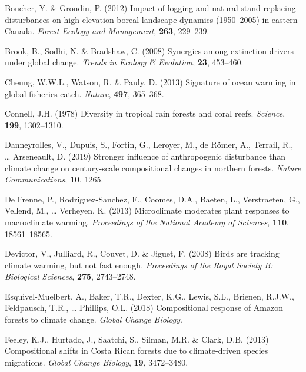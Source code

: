 \documentclass[a4paperpaper,]{article}
\begin{document}
\leavevmode\hypertarget{ref-boucher_impact_2012}{}%
Boucher, Y. \& Grondin, P. (2012) Impact of logging and natural
stand-replacing disturbances on high-elevation boreal landscape dynamics
(1950--2005) in eastern Canada. \emph{Forest Ecology and Management},
\textbf{263}, 229--239.

\leavevmode\hypertarget{ref-brook_synergies_2008}{}%
Brook, B., Sodhi, N. \& Bradshaw, C. (2008) Synergies among extinction
drivers under global change. \emph{Trends in Ecology \& Evolution},
\textbf{23}, 453--460.

\leavevmode\hypertarget{ref-cheung_signature_2013}{}%
Cheung, W.W.L., Watson, R. \& Pauly, D. (2013) Signature of ocean
warming in global fisheries catch. \emph{Nature}, \textbf{497},
365--368.

\leavevmode\hypertarget{ref-connell_diversity_1978}{}%
Connell, J.H. (1978) Diversity in tropical rain forests and coral reefs.
\emph{Science}, \textbf{199}, 1302--1310.

\leavevmode\hypertarget{ref-danneyrolles_stronger_2019}{}%
Danneyrolles, V., Dupuis, S., Fortin, G., Leroyer, M., de Römer, A.,
Terrail, R., \ldots{} Arseneault, D. (2019) Stronger influence of
anthropogenic disturbance than climate change on century-scale
compositional changes in northern forests. \emph{Nature Communications},
\textbf{10}, 1265.

\leavevmode\hypertarget{ref-de_frenne_microclimate_2013}{}%
De Frenne, P., Rodriguez-Sanchez, F., Coomes, D.A., Baeten, L.,
Verstraeten, G., Vellend, M., \ldots{} Verheyen, K. (2013) Microclimate
moderates plant responses to macroclimate warming. \emph{Proceedings of
the National Academy of Sciences}, \textbf{110}, 18561--18565.

\leavevmode\hypertarget{ref-devictor_birds_2008}{}%
Devictor, V., Julliard, R., Couvet, D. \& Jiguet, F. (2008) Birds are
tracking climate warming, but not fast enough. \emph{Proceedings of the
Royal Society B: Biological Sciences}, \textbf{275}, 2743--2748.

\leavevmode\hypertarget{ref-esquivel-muelbert_compositional_2018}{}%
Esquivel-Muelbert, A., Baker, T.R., Dexter, K.G., Lewis, S.L., Brienen,
R.J.W., Feldpausch, T.R., \ldots{} Phillips, O.L. (2018) Compositional
response of Amazon forests to climate change. \emph{Global Change
Biology}.

\leavevmode\hypertarget{ref-feeley_compositional_2013}{}%
Feeley, K.J., Hurtado, J., Saatchi, S., Silman, M.R. \& Clark, D.B.
(2013) Compositional shifts in Costa Rican forests due to climate-driven
species migrations. \emph{Global Change Biology}, \textbf{19},
3472--3480.
\end{document}

